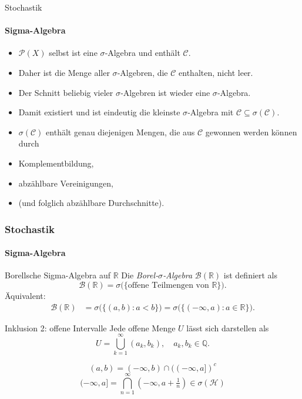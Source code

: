 \documentclass{beamer}
\begin{document}
  \begin{frame}{Stochastik}
    \framesubtitle{Sigma-Algebra}
    \begin{itemize}
      \item $\mathcal{P}(X)$ selbst ist eine $\sigma$‑Algebra und enthält $\mathcal{C}$.  
      \item Daher ist die Menge aller $\sigma$‑Algebren, die $\mathcal{C}$ enthalten, nicht leer.  
      \item Der Schnitt beliebig vieler $\sigma$‑Algebren ist wieder eine $\sigma$‑Algebra.  
      \item Damit existiert und ist eindeutig die kleinste $\sigma$‑Algebra mit $\mathcal{C}\subseteq\sigma(\mathcal{C})$.

      \item $\sigma(\mathcal{C})$ enthält genau diejenigen Mengen, die aus $\mathcal{C}$ gewonnen werden können durch
      
          \item Komplementbildung,
          \item abzählbare Vereinigungen,
          \item (und folglich abzählbare Durchschnitte).
       \end{itemize}
  \end{frame}
  
  \begin{frame}{}
    \frametitle{Stochastik}
    \framesubtitle{Sigma-Algebra}
\begin{block}{Borellsche Sigma-Algebra auf $\mathbb{R}$}
    Die \emph{Borel‑$\sigma$‑Algebra} $\mathcal B(\mathbb R)$ ist definiert als
    \[
      \mathcal B(\mathbb R)
      =
      \sigma\bigl(\{\text{offene Teilmengen von }\mathbb R\}\bigr).
    \]
    Äquivalent:
    \begin{align*}
      \mathcal B(\mathbb R)
      &= \sigma\bigl(\{(a,b):a<b\}\bigr)
      = \sigma\bigl(\{(-\infty,a):a\in\mathbb R\}\bigr).
    \end{align*}
\end{block}
  \end{frame}

  

  \begin{frame}{Inklusion 2: offene Intervalle}
    Jede offene Menge $U$ lässt sich darstellen als
    \[
      U=\bigcup_{k=1}^\infty(a_k,b_k),\quad a_k,b_k\in\mathbb Q.
    \]
   
    \[
      (a,b)=(-\infty,b)\cap(( -\infty,a])^c
    \]
    \[
      (-\infty,a]=\bigcap_{n=1}^\infty(-\infty,a+\tfrac1n)\in\sigma(\mathcal H)
    \]
  

    
  \end{frame}
\end{document}
